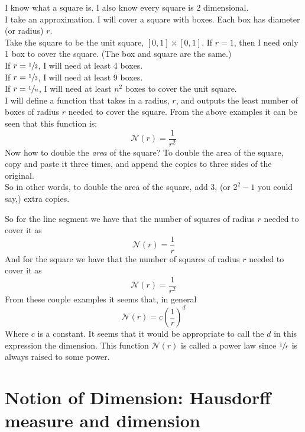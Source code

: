 \documentclass[11pt]{ekblite}
\begin{document}
\begin{example}[Square]
	I know what a square is. I also know every square is 2 dimensional.
	\\[0.2in]I take an approximation. I will cover a square with boxes. Each box has diameter (or radius) $r$.
	\\[0.2in]Take the square to be the unit square, $[0,1] \times [0,1]$. If $r = 1$, then I need only 1 box to cover the square. (The box and square are the same.)
	\\[0.2in]If $r = \sfrac{1}{2}$, I will need at least 4 boxes.
	\\[0.2in]If $r = \sfrac{1}{3}$, I will need at least 9 boxes.
	\\[0.2in]If $r = \sfrac{1}{n}$, I will need at least $n^2$ boxes to cover the unit square.
	\\[0.2in]I will define a function that takes in a radius, $r$, and outputs the least number of boxes of radius $r$ needed to cover the square. From the above examples it can be seen that this function is:
	\[\mathcal{N}(r) = \frac{1}{r^2}\]
	Now how to double the \textit{area} of the square? To double the area of the square, copy and paste it three times, and append the copies to three sides of the original. 
	\\[0.2in]So in other words, to double the area of the square, add 3, (or $2^2 - 1$ you could say,) extra copies.
\end{example}
So for the line segment we have that the number of squares of radius $r$ needed to cover it as
\[\mathcal{N}(r) = \frac{1}{r}\]
And for the square we have that the number of squares of radius $r$ needed to cover it as
\[\mathcal{N}(r) = \frac{1}{r^2}\]
From these couple examples it seems that, in general
\[\mathcal{N}(r) = c \left(\frac{1}{r}\right)^d\]
Where $c$ is a constant. It seems that it would be appropriate to call the $d$ in this expression the dimension. This function $\mathcal{N}(r)$ is called a power law since $\sfrac{1}{r}$ is always raised to some power. \cite{falconer2}

\newpage
\section{Notion of Dimension: Hausdorff measure and dimension}
\newpage
\end{document}
